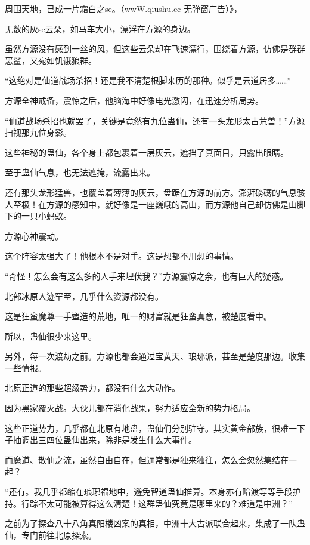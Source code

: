 
\begin{this_body}

周围天地，已成一片霜白之se。（wwW.qiushu.cc 无弹窗广告）》，

无数的灰se云朵，如马车大小，漂浮在方源的身边。

虽然方源没有感到一丝的风，但这些云朵却在飞速漂行，围绕着方源，仿佛是群群恶鲨，又宛如饥饿狼群。

“这绝对是仙道战场杀招！还是我不清楚根脚来历的那种。似乎是云道居多……”

方源全神戒备，震惊之后，他脑海中好像电光激闪，在迅速分析局势。

“仙道战场杀招也就罢了，关键是竟然有九位蛊仙，还有一头龙形太古荒兽！”方源扫视那九位身影。

这些神秘的蛊仙，各个身上都包裹着一层灰云，遮挡了真面目，只露出眼睛。

至于蛊仙气息，也无法遮掩，流露出来。

还有那头龙形猛兽，也覆盖着薄薄的灰云，盘踞在方源的前方。澎湃磅礴的气息骇人至极！在方源的感知中，就好像是一座巍峨的高山，而方源他自己却仿佛是山脚下的一只小蚂蚁。

方源心神震动。

这个阵容太强大了！他根本不是对手。这是想都不用想的事情。

“奇怪！怎么会有这么多的人手来埋伏我？”方源震惊之余，也有巨大的疑惑。

北部冰原人迹罕至，几乎什么资源都没有。

这是狂蛮魔尊一手塑造的荒地，唯一的财富就是狂蛮真意，被楚度看中。

所以，蛊仙很少来这里。

另外，每一次渡劫之前。方源也都会通过宝黄天、琅琊派，甚至是楚度那边。收集一些情报。

北原正道的那些超级势力，都没有什么大动作。

因为黑家覆灭战。大伙儿都在消化战果，努力适应全新的势力格局。

这些正道势力，几乎都在北原有地盘，蛊仙们分别驻守。其实黄金部族，很难一下子抽调出三四位蛊仙出来，除非是发生什么大事件。

而魔道、散仙之流，虽然自由自在，但通常都是独来独往，怎么会忽然集结在一起？

“还有。我几乎都缩在琅琊福地中，避免智道蛊仙推算。本身亦有暗渡等等手段护持。行踪不太可能被算得这么清楚！这群蛊仙究竟是哪里来的？难道是中洲？”

之前为了探查八十八角真阳楼凶案的真相，中洲十大古派联合起来，集成了一队蛊仙，专门前往北原探索。


\end{this_body}
